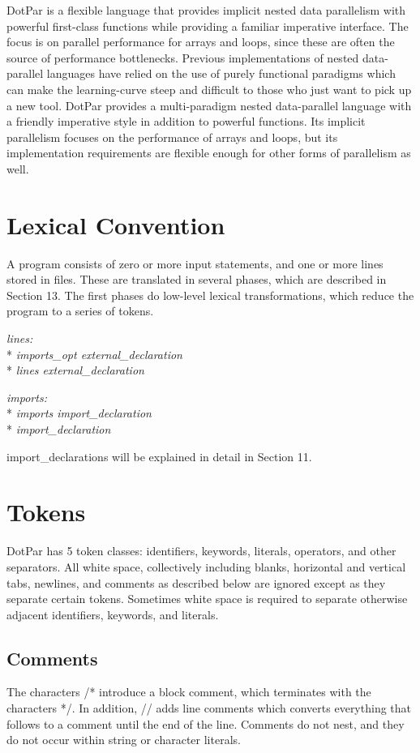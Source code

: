 DotPar is a flexible language that provides implicit nested data parallelism
with powerful first-class functions while providing a familiar imperative
interface. The focus is on parallel performance for arrays and loops, since
these are often the source of performance bottlenecks.
\newline
\newline
Previous implementations of nested data-parallel languages have relied on
the use of purely functional paradigms which can make the learning-curve steep
and difficult to those who just want to pick up a new tool. DotPar provides a
multi-paradigm nested data-parallel language with a friendly imperative style in
addition to powerful functions. Its implicit parallelism focuses on the
performance of arrays and loops, but its implementation requirements are
flexible enough for other forms of parallelism as well.

\section{Lexical Convention}
A program consists of zero or more input statements, and one or more lines
stored in files. These are translated in several phases, which are described in
Section 13. The first phases do low-level lexical transformations, which reduce
the program to a series of tokens.

\tab \emph{lines:} 
\\* \tab \tab \tab \textit{imports\_opt external\_declaration}
\\* \tab \tab \tab \emph{lines external\_declaration}

 \tab \emph{imports:}
\\* \tab \tab \tab \textit{imports import\_declaration}
\\* \tab \tab \tab \textit{import\_declaration}

import\_declarations will be explained in detail in Section 11.

\section{Tokens}
DotPar has 5 token classes: identifiers, keywords, literals, operators, and
other separators. All white space, collectively including blanks, horizontal and
vertical tabs, newlines, and comments as described below are ignored except as
they separate certain tokens. Sometimes white space is required to separate
otherwise adjacent identifiers, keywords, and literals.
\subsection{Comments}
The characters /* introduce a block comment, which terminates with the characters */. In addition, // adds line comments which converts everything that follows to a comment until the end of the line. Comments do not nest, and they do not occur within string or character literals.
